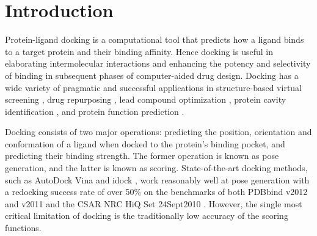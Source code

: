 \documentclass[linenumbers]{bmcart}
\begin{document}


\section*{Introduction}

Protein-ligand docking is a computational tool that predicts how a ligand binds to a target protein and their binding affinity. Hence docking is useful in elaborating intermolecular interactions and enhancing the potency and selectivity of binding in subsequent phases of computer-aided drug design. Docking has a wide variety of pragmatic and successful applications in structure-based virtual screening \cite{1383}, drug repurposing \cite{1384}, lead compound optimization \cite{1385}, protein cavity identification \cite{1217}, and protein function prediction \cite{1386}.

Docking consists of two major operations: predicting the position, orientation and conformation of a ligand when docked to the protein's binding pocket, and predicting their binding strength. The former operation is known as pose generation, and the latter is known as scoring. State-of-the-art docking methods, such as AutoDock Vina \cite{595} and idock \cite{1153}, work reasonably well at pose generation with a redocking success rate of over 50\% \cite{1362} on the benchmarks of both PDBbind v2012 and v2011 \cite{529,530} and the CSAR NRC HiQ Set 24Sept2010 \cite{857,960}. However, the single most critical limitation of docking is the traditionally low accuracy of the scoring functions.
\end{document}
